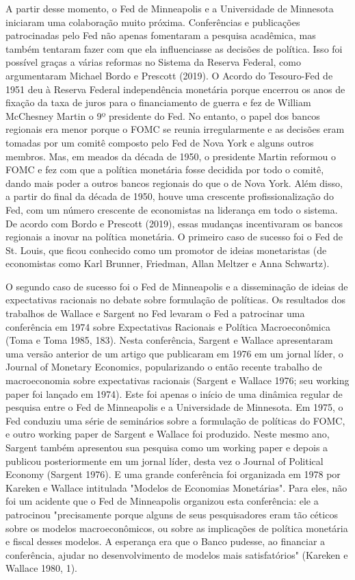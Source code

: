 \documentclass[a4paper,12pt]{article}[abntex2]
\begin{document}
A partir desse momento, o Fed de Minneapolis e a Universidade de Minnesota iniciaram uma colaboração muito próxima. Conferências e publicações patrocinadas pelo Fed não apenas fomentaram a pesquisa acadêmica, mas também tentaram fazer com que ela influenciasse as decisões de política. Isso foi possível graças a várias reformas no Sistema da Reserva Federal, como argumentaram Michael Bordo e Prescott (2019). O Acordo do Tesouro-Fed de 1951 deu à Reserva Federal independência monetária porque encerrou os anos de fixação da taxa de juros para o financiamento de guerra e fez de William McChesney Martin o 9º presidente do Fed. No entanto, o papel dos bancos regionais era menor porque o FOMC se reunia irregularmente e as decisões eram tomadas por um comitê composto pelo Fed de Nova York e alguns outros membros. Mas, em meados da década de 1950, o presidente Martin reformou o FOMC e fez com que a política monetária fosse decidida por todo o comitê, dando mais poder a outros bancos regionais do que o de Nova York. Além disso, a partir do final da década de 1950, houve uma crescente profissionalização do Fed, com um número crescente de economistas na liderança em todo o sistema. De acordo com Bordo e Prescott (2019), essas mudanças incentivaram os bancos regionais a inovar na política monetária. O primeiro caso de sucesso foi o Fed de St. Louis, que ficou conhecido como um promotor de ideias monetaristas (de economistas como Karl Brunner, Friedman, Allan Meltzer e Anna Schwartz).

O segundo caso de sucesso foi o Fed de Minneapolis e a disseminação de ideias de expectativas racionais no debate sobre formulação de políticas. Os resultados dos trabalhos de Wallace e Sargent no Fed levaram o Fed a patrocinar uma conferência em 1974 sobre Expectativas Racionais e Política Macroeconômica (Toma e Toma 1985, 183). Nesta conferência, Sargent e Wallace apresentaram uma versão anterior de um artigo que publicaram em 1976 em um jornal líder, o Journal of Monetary Economics, popularizando o então recente trabalho de macroeconomia sobre expectativas racionais (Sargent e Wallace 1976; seu working paper foi lançado em 1974). Este foi apenas o início de uma dinâmica regular de pesquisa entre o Fed de Minneapolis e a Universidade de Minnesota. Em 1975, o Fed conduziu uma série de seminários sobre a formulação de políticas do FOMC, e outro working paper de Sargent e Wallace foi produzido. Neste mesmo ano, Sargent também apresentou sua pesquisa como um working paper e depois a publicou posteriormente em um jornal líder, desta vez o Journal of Political Economy (Sargent 1976). E uma grande conferência foi organizada em 1978 por Kareken e Wallace intitulada "Modelos de Economias Monetárias". Para eles, não foi um acidente que o Fed de Minneapolis organizou esta conferência: ele a patrocinou "precisamente porque alguns de seus pesquisadores eram tão céticos sobre os modelos macroeconômicos, ou sobre as implicações de política monetária e fiscal desses modelos. A esperança era que o Banco pudesse, ao financiar a conferência, ajudar no desenvolvimento de modelos mais satisfatórios" (Kareken e Wallace 1980, 1).
\end{document}
